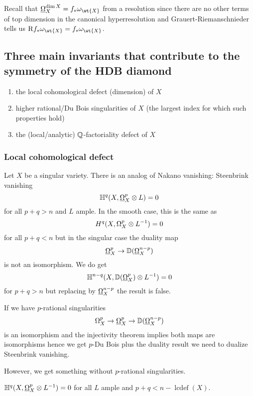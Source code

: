 \documentclass[12pt]{article}
\newcommand{\HH}{\mathbb{H}}
\newcommand{\R}{\mathrm{R}}
\DeclareMathOperator{\lcdef}{\mathrm{lcdef}}
\begin{document}
\begin{rmk}
Recall that $\ulO_X^{\dim{X}} = f_* \omega_{\wt{X}}$ from a resolution since there are no other terms of top dimension in the canonical hyperresolution and Grauert-Riemanschnieder tells us $\R f_* \omega_{\wt{X}} = f_* \omega_{\wt{X}}$.
\end{rmk}

\subsection{Three main invariants that contribute to the symmetry of the HDB diamond}

\begin{enumerate}
\item the local cohomological defect (dimension) of $X$
\item higher rational/Du Bois singularities of $X$ (the largest index for which such properties hold)
\item the (local/analytic) $\mathbb{Q}$-factoriality defect of $X$ 
\end{enumerate}

\subsubsection{Local cohomological defect}

Let $X$ be a singular variety. There is an analog of Nakano vanishing: Steenbrink vanishing
\[ \HH^q(X, \ulO_X^p \ot L) = 0 \]
for all $p+q > n$ and $L$ ample. In the smooth case, this is the same as
\[ H^q(X, \Omega_X^p \otimes L^{-1}) = 0 \]
for all $p + q < n$ but in the singular case the duality map
\[ \underline{\Omega}_X^p \to \mathbb{D}(\underline{\Omega}_X^{n-p}) \]
is not an isomorphism. We do get
\[ \HH^{n-q}(X, \DD(\ulO_X^p) \ot L^{-1}) = 0 \]
for $p + q > n$ but replacing by $\underline{\Omega}_X^{n-p}$ the result is false. 

\begin{rmk}
If we have $p$-rational singularities
\[ \Omega_X^p \to \underline{\Omega}_X^p \to \mathbb{D}(\underline{\Omega}_X^{n-p}) \]
is an isomorphism and the injectivity theorem implies both maps are isomorphisms hence we get $p$-Du Bois plus the duality result we need to dualize Steenbrink vanishing.
\end{rmk}

However, we get something without $p$-rational singularities.


\begin{theorem}
$\HH^q(X, \ulO_X^p \ot L^{-1}) = 0$ for all $L$ ample and $p + q < n - \lcdef(X)$.
\end{theorem}
\end{document}
